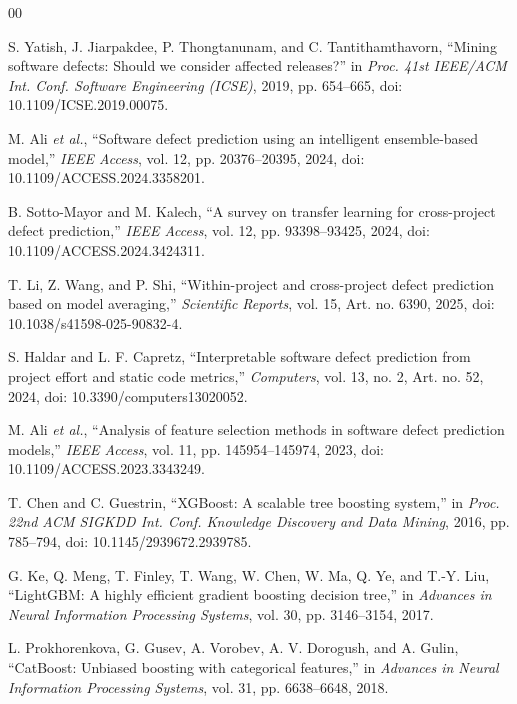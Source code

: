 \documentclass[conference]{IEEEtran}
\begin{document}
\begin{thebibliography}{00}

S. Yatish, J. Jiarpakdee, P. Thongtanunam, and
C. Tantithamthavorn,
``Mining software defects: Should we consider affected releases?''
in \emph{Proc. 41st IEEE/ACM Int. Conf. Software Engineering
(ICSE)}, 2019, pp. 654--665,
doi: 10.1109/ICSE.2019.00075.

M. Ali \emph{et al.},
``Software defect prediction using an intelligent
ensemble-based model,''
\emph{IEEE Access}, vol. 12, pp. 20376--20395, 2024,
doi: 10.1109/ACCESS.2024.3358201.

B. Sotto-Mayor and M. Kalech,
``A survey on transfer learning for cross-project defect
prediction,''
\emph{IEEE Access}, vol. 12, pp. 93398--93425, 2024,
doi: 10.1109/ACCESS.2024.3424311.

T. Li, Z. Wang, and P. Shi,
``Within-project and cross-project defect prediction based
on model averaging,''
\emph{Scientific Reports}, vol. 15, Art. no. 6390, 2025,
doi: 10.1038/s41598-025-90832-4.

S. Haldar and L. F. Capretz,
``Interpretable software defect prediction from project
effort and static code metrics,''
\emph{Computers}, vol. 13, no. 2, Art. no. 52, 2024,
doi: 10.3390/computers13020052.

M. Ali \emph{et al.},
``Analysis of feature selection methods in software defect
prediction models,''
\emph{IEEE Access}, vol. 11, pp. 145954--145974, 2023,
doi: 10.1109/ACCESS.2023.3343249.

T. Chen and C. Guestrin,
``XGBoost: A scalable tree boosting system,''
in \emph{Proc. 22nd ACM SIGKDD Int. Conf. Knowledge
Discovery and Data Mining}, 2016, pp. 785--794,
doi: 10.1145/2939672.2939785.

G. Ke, Q. Meng, T. Finley, T. Wang, W. Chen, W. Ma,
Q. Ye, and T.-Y. Liu,
``LightGBM: A highly efficient gradient boosting decision
tree,''
in \emph{Advances in Neural Information Processing Systems},
vol. 30, pp. 3146--3154, 2017.

L. Prokhorenkova, G. Gusev, A. Vorobev,
A. V. Dorogush, and A. Gulin,
``CatBoost: Unbiased boosting with categorical features,''
in \emph{Advances in Neural Information Processing Systems},
vol. 31, pp. 6638--6648, 2018.


\end{thebibliography}
\end{document}
